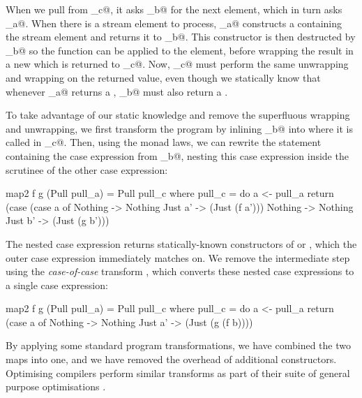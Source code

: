 When we pull from \Hs@pull_c@, it asks \Hs@pull_b@ for the next element, which in turn asks \Hs@pull_a@.
When there is a stream element to process, \Hs@pull_a@ constructs a \Hs@Just@ containing the stream element and returns it to \Hs@pull_b@.
This \Hs@Just@ constructor is then destructed by \Hs@pull_b@ so the function \Hs@f@ can be applied to the element, before wrapping the result in a new \Hs@Just@ which is returned to \Hs@pull_c@.
Now, \Hs@pull_c@ must perform the same unwrapping and wrapping on the returned value, even though we statically know that whenever \Hs@pull_a@ returns a \Hs@Just@, \Hs@pull_b@ must also return a \Hs@Just@.

To take advantage of our static knowledge and remove the superfluous wrapping and unwrapping, we first transform the program by inlining \Hs@pull_b@ into where it is called in \Hs@pull_c@.
Then, using the monad laws, we can rewrite the \Hs@return@ statement containing the case expression from \Hs@pull_b@, nesting this case expression inside the scrutinee of the other case expression:

\begin{haskell}
map2 f g (Pull pull_a) = Pull pull_c
 where
  pull_c = do
    a <- pull_a
    return (case (case a of
                   Nothing -> Nothing
                   Just a' -> (Just (f a')))
             Nothing -> Nothing
             Just b' -> (Just (g b')))
\end{haskell}

The nested case expression returns statically-known constructors of \Hs@Nothing@ or \Hs@Just@, which the outer case expression immediately matches on.
We remove the intermediate step using the \emph{case-of-case} transform \cite{jones1998transformation}, which converts these nested case expressions to a single case expression:

\begin{haskell}
map2 f g (Pull pull_a) = Pull pull_c
 where
  pull_c = do
    a <- pull_a
    return (case a of
             Nothing -> Nothing
             Just a' -> (Just (g (f b))))
\end{haskell}

By applying some standard program transformations, we have combined the two maps into one, and we have removed the overhead of additional constructors.
Optimising compilers perform similar transforms as part of their suite of general purpose optimisations \citep{jones1996compiling}.

